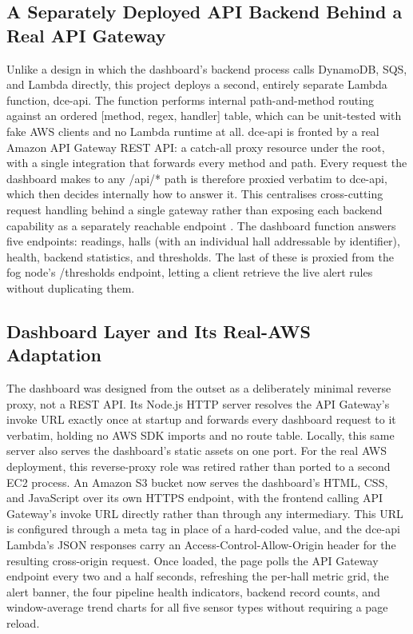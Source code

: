 \documentclass[conference]{IEEEtran}
\begin{document}
\subsection{A Separately Deployed API Backend Behind a Real API Gateway}
Unlike a design in which the dashboard's backend process calls DynamoDB, SQS, and Lambda directly, this project deploys a second, entirely separate Lambda function, dce-api. The function performs internal path-and-method routing against an ordered [method, regex, handler] table, which can be unit-tested with fake AWS clients and no Lambda runtime at all. dce-api is fronted by a real Amazon API Gateway REST API: a catch-all proxy resource under the root, with a single integration that forwards every method and path. Every request the dashboard makes to any /api/* path is therefore proxied verbatim to dce-api, which then decides internally how to answer it. This centralises cross-cutting request handling behind a single gateway rather than exposing each backend capability as a separately reachable endpoint \cite{ref11}. The dashboard function answers five endpoints: readings, halls (with an individual hall addressable by identifier), health, backend statistics, and thresholds. The last of these is proxied from the fog node's /thresholds endpoint, letting a client retrieve the live alert rules without duplicating them.

\subsection{Dashboard Layer and Its Real-AWS Adaptation}
The dashboard was designed from the outset as a deliberately minimal reverse proxy, not a REST API. Its Node.js HTTP server resolves the API Gateway's invoke URL exactly once at startup and forwards every dashboard request to it verbatim, holding no AWS SDK imports and no route table. Locally, this same server also serves the dashboard's static assets on one port. For the real AWS deployment, this reverse-proxy role was retired rather than ported to a second EC2 process. An Amazon S3 bucket now serves the dashboard's HTML, CSS, and JavaScript over its own HTTPS endpoint, with the frontend calling API Gateway's invoke URL directly rather than through any intermediary. This URL is configured through a meta tag in place of a hard-coded value, and the dce-api Lambda's JSON responses carry an Access-Control-Allow-Origin header for the resulting cross-origin request. Once loaded, the page polls the API Gateway endpoint every two and a half seconds, refreshing the per-hall metric grid, the alert banner, the four pipeline health indicators, backend record counts, and window-average trend charts for all five sensor types without requiring a page reload.
\end{document}
